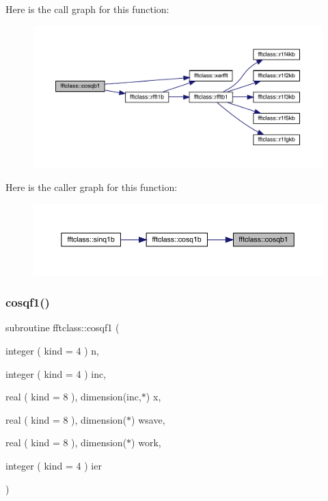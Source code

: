 Here is the call graph for this function\+:\nopagebreak
\begin{figure}[H]
\begin{center}
\leavevmode
\includegraphics[width=350pt]{namespacefftclass_a4f908baf4cda5a6be5b71eb85fc9309c_cgraph}
\end{center}
\end{figure}
Here is the caller graph for this function\+:\nopagebreak
\begin{figure}[H]
\begin{center}
\leavevmode
\includegraphics[width=350pt]{namespacefftclass_a4f908baf4cda5a6be5b71eb85fc9309c_icgraph}
\end{center}
\end{figure}
\mbox{\label{namespacefftclass_a894b76f80148bf5d923d558356a6cc1a}} 
\subsubsection{\texorpdfstring{cosqf1()}{cosqf1()}}
{\footnotesize\ttfamily subroutine fftclass\+::cosqf1 (\begin{DoxyParamCaption}\item[{integer ( kind = 4 )}]{n,  }\item[{integer ( kind = 4 )}]{inc,  }\item[{real ( kind = 8 ), dimension(inc,$\ast$)}]{x,  }\item[{real ( kind = 8 ), dimension($\ast$)}]{wsave,  }\item[{real ( kind = 8 ), dimension($\ast$)}]{work,  }\item[{integer ( kind = 4 )}]{ier }\end{DoxyParamCaption})}

